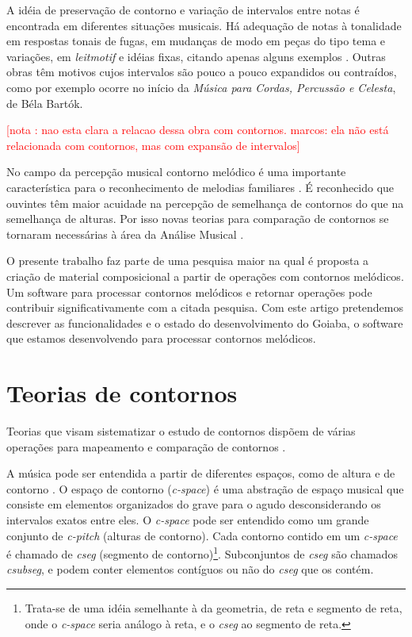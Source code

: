 \documentclass[brazil]{article}
\newcommand{\eng}[1]{\textit{#1}}
\newcommand{\opus}[1]{\textit{#1}}
\newcommand{\termo}[1]{\textit{#1}}
\newcounter{notacounter}
\newcommand{\note}[1]{
  \addtocounter{notacounter}{1}
  \textcolor{red}{[nota \arabic{notacounter}: #1]}
}
\begin{document}
A idéia de preservação de contorno e variação de intervalos entre
notas é encontrada em diferentes situações musicais. Há adequação de
notas à tonalidade em respostas tonais de fugas, em mudanças de modo
em peças do tipo tema e variações, em \eng{leitmotif} e idéias fixas,
citando apenas alguns exemplos
\cite[p. 29]{morris87:composition}. Outras obras têm motivos cujos
intervalos são pouco a pouco expandidos ou contraídos, como por
exemplo ocorre no início da \opus{Música para Cordas, Percussão e
  Celesta}, de Béla Bartók. \note{nao esta clara a relacao dessa obra
  com contornos. marcos: ela não está relacionada com contornos, mas
  com expansão de intervalos}

No campo da percepção musical contorno melódico é uma importante
característica para o reconhecimento de melodias familiares \cite[p.
136]{dowling.ea86:music}. É reconhecido que ouvintes têm maior
acuidade na percepção de semelhança de contornos do que na semelhança
de alturas. Por isso novas teorias para comparação de contornos se
tornaram necessárias à área da Análise Musical
\cite[p. 226]{marvin.ea87:relating}.


O presente trabalho faz parte de uma pesquisa maior na qual é proposta
a criação de material composicional a partir de operações com
contornos melódicos. Um software para processar contornos melódicos e
retornar operações pode contribuir significativamente com a citada
pesquisa. Com este artigo pretendemos descrever as funcionalidades e o
estado do desenvolvimento do Goiaba, o software que estamos
desenvolvendo para processar contornos melódicos.

\section{Teorias de contornos}
\label{sec:teorias-de-contornos}

Teorias que visam sistematizar o estudo de contornos dispõem de várias
operações para mapeamento e comparação de contornos
\cite{friedmann85:methodology,friedmann87:response,morris87:composition,morris93:directions,marvin.ea87:relating,clifford95:contour,polansky.ea92:possible,quinn97:fuzzy,beard03:contour}.

A música pode ser entendida a partir de diferentes espaços, como de
altura e de contorno \cite{morris87:composition}. O espaço de contorno
(\termo{c-space}) é uma abstração de espaço musical que consiste em
elementos organizados do grave para o agudo desconsiderando os
intervalos exatos entre eles. O \termo{c-space} pode ser entendido
como um grande conjunto de \termo{c-pitch} (alturas de contorno). Cada
contorno contido em um \termo{c-space} é chamado de \termo{cseg}
(segmento de contorno)\footnote{Trata-se de uma idéia semelhante à da
  geometria, de reta e segmento de reta, onde o \termo{c-space} seria
  análogo à reta, e o \termo{cseg} ao segmento de reta.}. Subconjuntos
de \termo{cseg} são chamados \termo{csubseg}, e podem conter elementos
contíguos ou não do \termo{cseg} que os contém.
\end{document}
